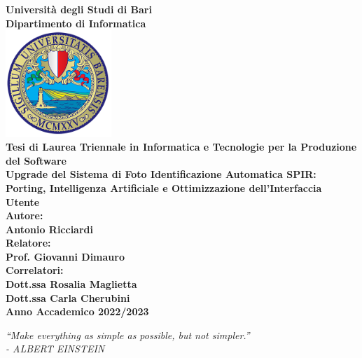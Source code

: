 \documentclass[a4paper,12pt]{report}
\begin{document}

\begin{titlepage}
\centering

\textbf{\large Università degli Studi di Bari} \\
\vspace{0.3cm}
\textbf{\large Dipartimento di Informatica} \\
\vspace{1cm}
\includegraphics[width=40mm,scale=0.5]{assets/images/logo.png} \\
\vspace{1cm}
\textbf{\large Tesi di Laurea Triennale in Informatica e Tecnologie per la Produzione del Software} \\
\vspace{1cm}
\textbf{\LARGE Upgrade del Sistema di Foto Identificazione Automatica SPIR: Porting, Intelligenza Artificiale e Ottimizzazione dell'Interfaccia Utente} \\
\vspace{0.7cm}
\textbf{\large Autore:} \\
\textbf{Antonio Ricciardi} \\
\vspace{0.3cm}
\textbf{\large Relatore:} \\
\textbf{Prof. Giovanni Dimauro} \\
\vspace{0.3cm}
\textbf{\large Correlatori:} \\
\textbf{Dott.ssa Rosalia Maglietta} \\
\textbf{Dott.ssa Carla Cherubini} \\
\vfill
\vspace{0.3cm}
\textbf{Anno Accademico 2022/2023} %
    
\end{titlepage}
\clearpage
\thispagestyle{empty}

\vspace*{\fill}
\begin{center}
\textit{“Make everything as simple as possible, but not simpler.”\\
- ALBERT EINSTEIN}
\end{center}
\vfill
\clearpage
\tableofcontents
\end{document}
